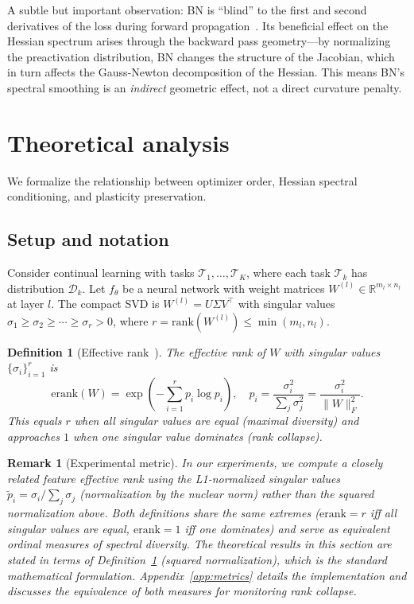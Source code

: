 \documentclass{article}
\newtheorem{remark}{Remark}
\newtheorem{definition}{Definition}
\newcommand{\erank}{\mathrm{erank}}
\newcommand{\RR}{\mathbb{R}}
\newcommand{\cT}{\mathcal{T}}
\begin{document}
A subtle but important observation: BN is ``blind'' to the first and second derivatives of the loss during forward propagation~\citep{karakida2019bnblind}. Its beneficial effect on the Hessian spectrum arises through the backward pass geometry---by normalizing the preactivation distribution, BN changes the structure of the Jacobian, which in turn affects the Gauss-Newton decomposition of the Hessian. This means BN's spectral smoothing is an \emph{indirect} geometric effect, not a direct curvature penalty.

\section{Theoretical analysis}
\label{sec:theory}

We formalize the relationship between optimizer order, Hessian spectral conditioning, and plasticity preservation.

\subsection{Setup and notation}

Consider continual learning with tasks $\cT_1, \ldots, \cT_K$, where each task $\cT_k$ has distribution $\mathcal{D}_k$. Let $f_\theta$ be a neural network with weight matrices $W^{(l)} \in \RR^{m_l \times n_l}$ at layer $l$. The compact SVD is $W^{(l)} = U \Sigma V^\top$ with singular values $\sigma_1 \geq \sigma_2 \geq \cdots \geq \sigma_r > 0$, where $r = \mathrm{rank}(W^{(l)}) \leq \min(m_l, n_l)$.

\begin{definition}[Effective rank~\citep{roy2019theory}]
\label{def:erank}
The effective rank of $W$ with singular values $\{\sigma_i\}_{i=1}^r$ is
\[
\erank(W) = \exp\!\left(-\sum_{i=1}^{r} p_i \log p_i\right), \quad p_i = \frac{\sigma_i^2}{\sum_j \sigma_j^2} = \frac{\sigma_i^2}{\|W\|_F^2}.
\]
This equals $r$ when all singular values are equal (maximal diversity) and approaches $1$ when one singular value dominates (rank collapse).
\end{definition}

\begin{remark}[Experimental metric]
\label{rem:exp_erank}
In our experiments, we compute a closely related \emph{feature effective rank} using the L1-normalized singular values $\tilde{p}_i = \sigma_i / \sum_j \sigma_j$ (normalization by the nuclear norm) rather than the squared normalization above. Both definitions share the same extremes ($\erank = r$ iff all singular values are equal, $\erank = 1$ iff one dominates) and serve as equivalent ordinal measures of spectral diversity. The theoretical results in this section are stated in terms of Definition~\ref{def:erank} (squared normalization), which is the standard mathematical formulation. Appendix~\ref{app:metrics} details the implementation and discusses the equivalence of both measures for monitoring rank collapse.
\end{remark}
\end{document}
